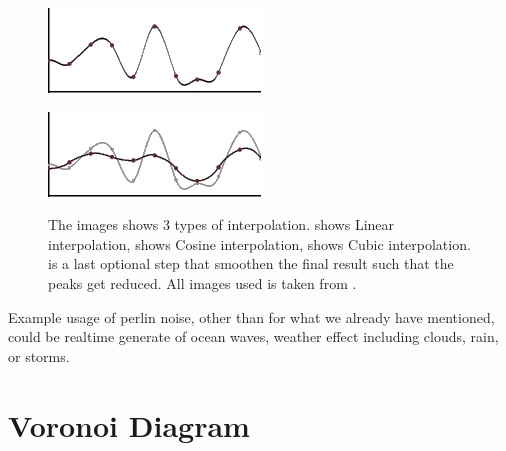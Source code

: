 \begin{figure}[H]
\begin{minipage}[b]{.5\linewidth}
	\end{minipage}
	\begin{minipage}[b]{.5\linewidth}
		\includegraphics[width=0.95\linewidth]{img/m_inter4}
		\label{fig:1c}
	\end{minipage}%
	\begin{minipage}[b]{.5\linewidth}
		\includegraphics[width=0.95\linewidth]{img/m_inter6}
		\label{fig:1d}
	\end{minipage}%

	\centering
	\caption{The images shows 3 types of interpolation.  shows Linear interpolation,  shows Cosine interpolation,  shows Cubic interpolation.  is a last optional step that smoothen the final result such that the peaks get reduced. All images used is taken from \cite{perlinnoise2}.}
	\label{fig:interpolation}
\end{figure}

Example usage of perlin noise, other than for what we already have mentioned, could be realtime generate of ocean waves, weather effect including clouds, rain, or storms.


\section{Voronoi Diagram}

